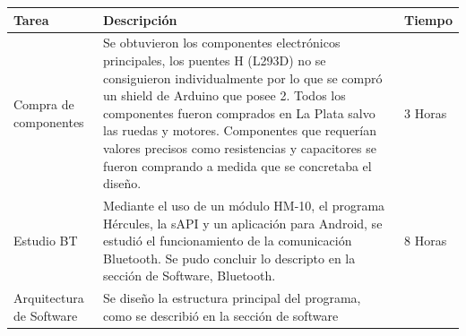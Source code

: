 \begin{longtable}[]{@{}lll@{}}
\toprule
\begin{minipage}[b]{0.17\columnwidth}\raggedright
Tarea\strut
\end{minipage} & \begin{minipage}[b]{0.64\columnwidth}\raggedright
Descripción\strut
\end{minipage} & \begin{minipage}[b]{0.10\columnwidth}\raggedright
Tiempo\strut
\end{minipage}\tabularnewline
\midrule
\endhead
\begin{minipage}[t]{0.17\columnwidth}\raggedright
Compra de componentes\strut
\end{minipage} & \begin{minipage}[t]{0.64\columnwidth}\raggedright
Se obtuvieron los componentes electrónicos principales, los puentes H
(L293D) no se consiguieron individualmente por lo que se compró un
shield de Arduino que posee 2. Todos los componentes fueron comprados en
La Plata salvo las ruedas y motores. Componentes que requerían valores
precisos como resistencias y capacitores se fueron comprando a medida
que se concretaba el diseño.\strut
\end{minipage} & \begin{minipage}[t]{0.10\columnwidth}\raggedright
3 Horas\strut
\end{minipage}\tabularnewline
\begin{minipage}[t]{0.17\columnwidth}\raggedright
Estudio BT\strut
\end{minipage} & \begin{minipage}[t]{0.64\columnwidth}\raggedright
Mediante el uso de un módulo HM-10, el programa Hércules, la sAPI y un
aplicación para Android, se estudió el funcionamiento de la comunicación
Bluetooth. Se pudo concluir lo descripto en la sección de Software,
Bluetooth.\strut
\end{minipage} & \begin{minipage}[t]{0.10\columnwidth}\raggedright
8 Horas\strut
\end{minipage}\tabularnewline
\begin{minipage}[t]{0.17\columnwidth}\raggedright
Arquitectura de Software\strut
\end{minipage} & \begin{minipage}[t]{0.64\columnwidth}\raggedright
Se diseño la estructura principal del programa, como se describió en la
sección de software\strut
\end{minipage} & \begin{minipage}[t]{0.10\columnwidth}\raggedright

\end{minipage}
\end{longtable}
